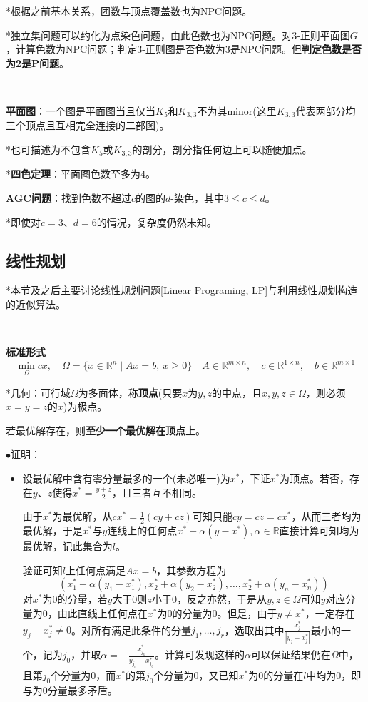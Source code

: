 \documentclass[a4paper,UTF8,fontset=windows]{ctexart}
\newcommand{\proo}[1]{{\kaishu $\bullet$证明：
\begin{itemize}
    \item[] #1
\end{itemize}
}}
\begin{document}
*根据之前基本关系，团数与顶点覆盖数也为NPC问题。

*独立集问题可以约化为点染色问题，由此色数也为NPC问题。对3-正则平面图$G$，计算色数为NPC问题；判定3-正则图是否色数为3是NPC问题。但\textbf{判定色数是否为2是P问题}。

\

\textbf{平面图}：一个图是平面图当且仅当$K_5$和$K_{3,3}$不为其minor(这里$K_{3,3}$代表两部分均三个顶点且互相完全连接的二部图)。

*也可描述为不包含$K_5$或$K_{3,3}$的剖分，剖分指任何边上可以随便加点。

*\textbf{四色定理}：平面图色数至多为4。

\textbf{AGC问题}：找到色数不超过$c$的图的$d$-染色，其中$3\le c\le d$。

*即使对$c=3$、$d=6$的情况，复杂度仍然未知。

\subsection{线性规划}
*本节及之后主要讨论线性规划问题[Linear Programing, LP]与利用线性规划构造的近似算法。

\

\textbf{标准形式}
$$\min_\Omega cx,\quad\Omega=\{x\in\mathbb{R}^n\mid Ax=b,\ x\ge0\}\quad A\in\mathbb{R}^{m\times n},\quad c\in\mathbb{R}^{1\times n},\quad b\in\mathbb{R}^{m\times 1}$$

*几何：可行域$\Omega$为多面体，称\textbf{顶点}(只要$x$为$y,z$的中点，且$x,y,z\in\Omega$，则必须$x=y=z$的$x$)为极点。

若最优解存在，则\textbf{至少一个最优解在顶点上}。

\proo{
    设最优解中含有零分量最多的一个(未必唯一)为$x^*$，下证$x^*$为顶点。若否，存在$y$、$z$使得$x^*=\frac{y+z}{2}$，且三者互不相同。

    由于$x^*$为最优解，从$cx^*=\frac{1}{2}(cy+cz)$可知只能$cy=cz=cx^*$，从而三者均为最优解，于是$x^*$与$y$连线上的任何点$x^*+\alpha(y-x^*),\alpha\in\mathbb{R}$直接计算可知均为最优解，记此集合为$l$。

    验证可知$l$上任何点满足$Ax=b$，其参数方程为
    $$(x^*_1+\alpha(y_1-x^*_1),x^*_2+\alpha(y_2-x^*_2),\dots,x^*_2+\alpha(y_n-x^*_n))$$
    对$x^*$为0的分量，若$y$大于0则$z$小于0，反之亦然，于是从$y,z\in\Omega$可知$y$对应分量为0，由此直线上任何点在$x^*$为0的分量为0。但是，由于$y\ne x^*$，一定存在$y_j-x^*_j\ne0$。对所有满足此条件的分量$j_1,\dots,j_r$，选取出其中$\frac{x^*_j}{|y_j-x^*_j|}$最小的一个，记为$j_0$，并取$\alpha=-\frac{x^*_{j_0}}{y_{j_0}-x^*_{j_0}}$。计算可发现这样的$\alpha$可以保证结果仍在$\Omega$中，且第$j_0$个分量为0，而$x^*$的第$j_0$个分量为0，又已知$x^*$为0的分量在$l$中均为0，即与为0分量最多矛盾。
}
\end{document}
